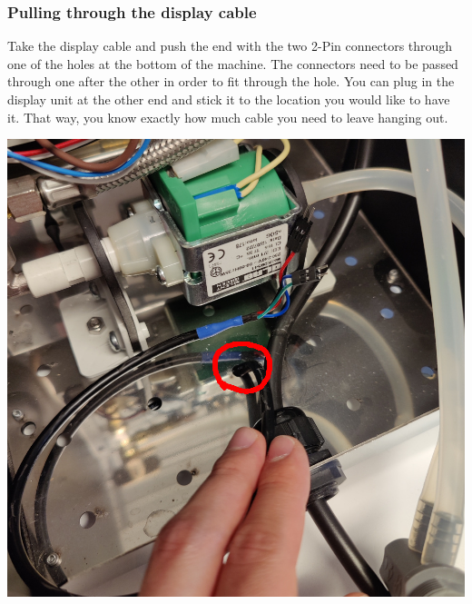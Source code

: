 \documentclass[]{article}
\begin{document}
\subsubsection{Pulling through the display cable}
\begin{minipage}[t]{0.5\linewidth}
	\vspace{0pt}
	Take the display cable and push the end with the two 2-Pin connectors through one of the holes at the bottom of the machine. The connectors need to be passed through one after the other in order to fit through the hole. You can plug in the display unit at the other end and stick it to the location you would like to have it. That way, you know exactly how much cable you need to leave hanging out.
\end{minipage}
\hfill
\begin{minipage}[t]{0.4\linewidth}
	\vspace{0pt}
	\includegraphics[width=\linewidth]{images/03_installation/10_push_through_cable.jpg}
\end{minipage}
\end{document}
